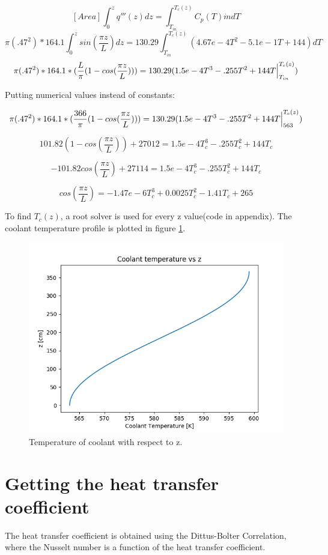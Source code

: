 \documentclass[12pt,letterpaper]{article}
\begin{document}
\[[Area] \int^{z}_0 q'''(z) dz = \int^{T_c (z)}_{T_{in}} C_p(T) \dot{m} dT\]
\[\pi (.47^2) * 164.1 \int^{z}_0 sin(\frac{\pi z}{L})  dz =
    130.29 \int^{T_c (z)}_{T_{in}} (4.67e-4T^2 -5.1e-1T + 144)  dT\]
\[\pi (.47^2) * 164.1 * (\frac{L}{\pi} (1-cos(\frac{\pi z}{L}))) =
    130.29 (1.5e-4T^3 - .255T^2 + 144 T \Big{|}^{T_c (z)}_{T_{in}})\]

Putting numerical values instead of constants:

\[\pi (.47^2) * 164.1 * (\frac{366}{\pi} (1-cos(\frac{\pi z}{L}))) =
    130.29 (1.5e-4T^3 - .255T^2 + 144 T \Big{|}^{T_c (z)}_{563})\]

\[101.82 (1- cos(\frac{\pi z}{L})) + 27012 = 1.5e-4T_c^3 - .255T_c^2 + 144 T_c \]

\[-101.82 cos(\frac{\pi z}{L}) + 27114 = 1.5e-4T_c^3 - .255T_c^2 + 144 T_c \]

\[ cos(\frac{\pi z}{L}) = -1.47e-6T_c^3 + 0.0025T_c^2 -1.41 T_c + 265\]

To find $T_c(z)$, a root solver is used for every z value(code in appendix).
The coolant temperature profile is plotted in figure \ref{fig:t_c_z}.

\begin{figure}[htbp!]
    \begin{center}
        \includegraphics[scale=0.7]{t_c_z.png}
    \end{center}
    \caption{Temperature of coolant with respect to z.}
    \label{fig:t_c_z}
\end{figure}


\section*{Getting the heat transfer coefficient}
The heat transfer coefficient is obtained using the Dittus-Bolter Correlation,
where the Nusselt number is a function of the heat transfer coefficient.
\end{document}
